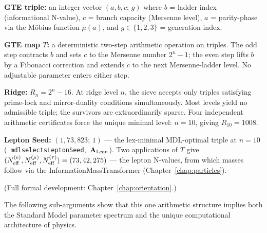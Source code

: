 \documentclass[11pt,openany]{book}
\theoremstyle{remark}
\newcommand{\lean}[1]{%
  \penalty-100
  \begingroup\def\_{\textunderscore\allowbreak}\texttt{#1}\endgroup}
\newcommand{\CatAL}{\ensuremath{\textbf{A}_{\rm Lean}}}
\begin{document}
\begin{tcolorbox}[colback=orange!3,colframe=orange!50!black,
  title={\textbf{UGP and GTE: Formal Definitions}},
  fonttitle=\small\bfseries, left=6pt, right=6pt, top=4pt, bottom=4pt]
\small
\textbf{GTE triple:} an integer vector $(a,b,c;\,g)$ where $b$ = ladder index
(informational N-value), $c$ = branch capacity (Mersenne level), $a$ = parity-phase
via the Möbius function $\mu(a)$, and $g \in \{1,2,3\}$ = generation index.

\textbf{GTE map $T$:} a deterministic two-step arithmetic operation on triples.
The odd step contracts $b$ and sets $c$ to the Mersenne number $2^n-1$;
the even step lifts $b$ by a Fibonacci correction and extends $c$ to the next
Mersenne-ladder level.
No adjustable parameter enters either step.

\textbf{Ridge:} $R_n = 2^n - 16$.
At ridge level $n$, the sieve accepts only triples satisfying prime-lock and
mirror-duality conditions simultaneously.
Most levels yield no admissible triple; the survivors are extraordinarily sparse.
Four independent arithmetic certificates force the unique minimal level: $n = 10$,
giving $R_{10} = 1008$.

\textbf{Lepton Seed:} $(1,73,823;\,1)$ --- the lex-minimal MDL-optimal triple at $n=10$
\mbox{(\lean{mdl\_selects\_LeptonSeed}, \CatAL)}.
Two applications of $T$ give $(N_{\rm eff}^{(e)}, N_{\rm eff}^{(\mu)}, N_{\rm eff}^{(\tau)})
= (73, 42, 275)$ --- the lepton N-values, from which masses follow via the
InformationMassTransformer (Chapter~\ref{chap:particles}).

\smallskip\noindent
(Full formal development: Chapter~\ref{chap:orientation}.)
\end{tcolorbox}

The following sub-arguments show that this one arithmetic structure implies
both the Standard Model parameter spectrum and the unique computational
architecture of physics.
\end{document}
